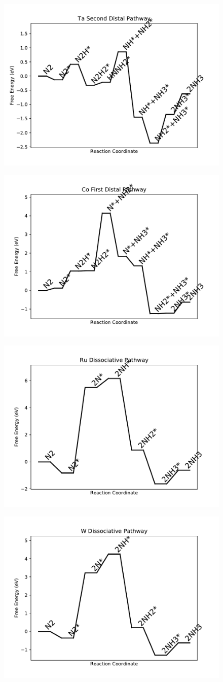 \begin{figure}
\includegraphics[width=0.5\linewidth]{data/plots/Ta_distal_2.pdf}
\label{fig:Ta_distal_2}
\end{figure}

\begin{figure}
\includegraphics[width=0.5\linewidth]{data/plots/Co_distal_1.pdf}
\label{fig:Co_distal_1}
\end{figure}

\begin{figure}
\includegraphics[width=0.5\linewidth]{data/plots/Ru_dissociative.pdf}
\label{fig:Ru_dissociative}
\end{figure}

\begin{figure}
\includegraphics[width=0.5\linewidth]{data/plots/W_dissociative.pdf}
\label{fig:W_dissociative}
\end{figure}

